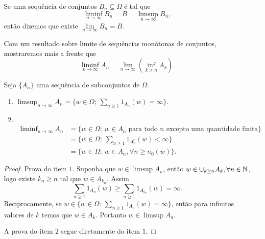 \begin{definicao}
	Se uma sequência de conjuntos $B_n \subseteq \Omega$ é tal que 
	\[
		\liminf \limits_{n \to \infty} B_n 
		= 
		B
		=
		\limsup \limits_{n \to \infty} B_n, 
	\]	
	então dizemos que existe $\lim \limits_{n \to \infty} B_n = B$.
\end{definicao}




\begin{observacao}
Com um resultado sobre limite de sequências monótonas de conjuntos, 
mostraremos mais a frente que
		 \[
		 	\liminf \limits_{n\to \infty}A_n 
			=
			\lim \limits_{n\to \infty}\left(\inf \limits_{k\geqslant n}A_k \right).
		 \]
\end{observacao}








\begin{lema}
Seja $\{A_n\}$ uma sequência de subconjuntos de $\Omega$.
\begin{enumerate}
\item 
$\displaystyle\limsup_{n\to\infty} A_n 
= 
\{ w \in \Omega;\ \sum_{n \geqslant 1} 1_{A_n}(w)= \infty \}$.

\item  \ \\[-0.4cm] \hspace*{-0.35cm} %
$
\begin{array}{rl}
\displaystyle\liminf_{n\to\infty} A_n 
&= \{ w \in \Omega;\ w \in A_n \text{ para todo $n$ excepto uma quantidade finita} \} \\
&= \{w \in \Omega;\ \sum_{n\geqslant 1} 1_{A_n^c}(w) < \infty \} \\[0.2cm]
&= \{w \in \Omega;\ w \in A_n, \forall n \geqslant n_0(w) \}. 
\end{array} 
$

\end{enumerate}
\end{lema}

\begin{proof}
Prova do item $1$. Suponha que $w \in \limsup A_n$, então 
$w \in \cup_{k \geq n} A_k,
\forall n \in \mathbb{N}$, logo existe $k_n \geqslant n$ tal que $w \in A_{k_n}$. 
Assim
%
	\[
		\sum \limits_{n \geqslant 1} 1_{A_n}(w) 
		\geqslant 
		\sum \limits_{n\geqslant 1} 1_{A_{k_n}}(w) 
		= 
		\infty.
	\]
%
Reciprocamente, 
se 
$ w \in \{ w \in \Omega;\ \sum_{n \geqslant 1} 1_{A_n}(w)= \infty \}$, 
então para infinitos valores de $k$ temos que $w \in A_k$. 
Portanto $w \in \limsup A_n$.

A prova do item $2$ segue diretamente do item $1$. 
\end{proof}



